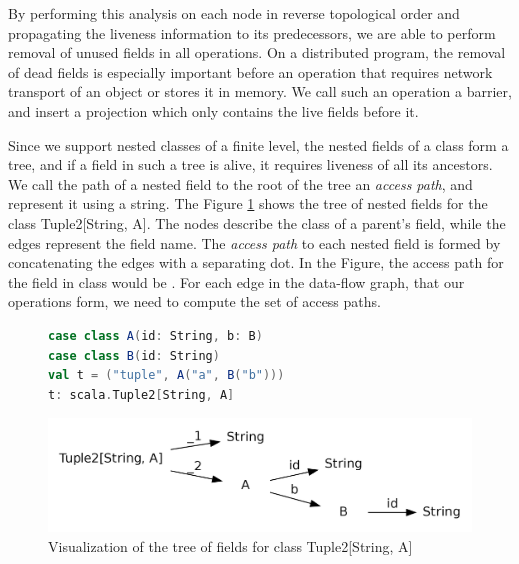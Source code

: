 By performing this analysis on each node in reverse topological order and propagating the liveness information to its predecessors, we are able to perform removal of unused fields in all operations. On a distributed program, the removal of dead fields is especially important before an operation that requires network transport of an object or stores it in memory. We call such an operation a barrier, and insert a projection which only contains the live fields before it. 

Since we support nested classes of a finite level, the nested fields of a class form a tree, and if a field in such a tree is alive, it requires liveness of all its ancestors. We call the path of a nested field to the root of the tree an \emph{access path}, and represent it using a string. The Figure \ref{fig:type_tree} shows the tree of nested fields for the class Tuple2[String, A]. The nodes describe the class of a parent's field, while the edges represent the field name. The \emph{access path} to each nested field is formed by concatenating the edges with a separating dot. In the Figure, the access path for the field  in class  would be . For each edge in the data-flow graph, that our operations form, we need to compute the set of access paths.

\begin{figure}[b]
\begin{lstlisting}[language=Scala,name=code]
case class A(id: String, b: B)
case class B(id: String)  
val t = ("tuple", A("a", B("b"))) 
t: scala.Tuple2[String, A]
\end{lstlisting}
\centering
\includegraphics[clip=true, width=0.95\columnwidth]{dot/access.png}
\caption{Visualization of the tree of fields for class Tuple2[String, A]}
\label{fig:type_tree}
\end{figure}

